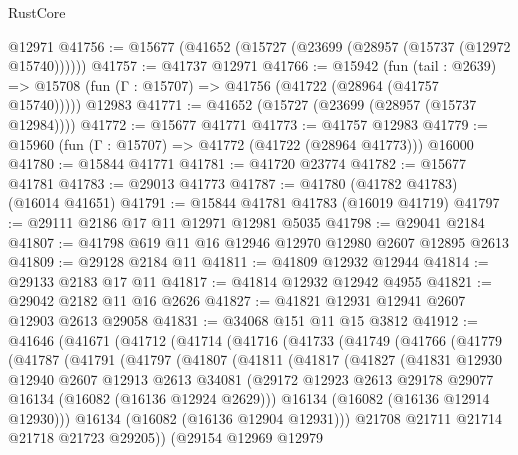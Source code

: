 \begin{lexlean}{RustCore}
\begin{coremodule}
    @12971
@41756 := @15677 (@41652 (@15727 (@23699 (@28957 (@15737 (@12972 @15740))))))
@41757 := @41737 @12971
@41766 := @15942
    (fun (tail : @2639) => @15708 (fun (Γ : @15707) => @41756 (@41722 (@28964 (@41757 @15740)))))
    @12983
@41771 := @41652 (@15727 (@23699 (@28957 (@15737 @12984))))
@41772 := @15677 @41771
@41773 := @41757 @12983
@41779 := @15960 (fun (Γ : @15707) => @41772 (@41722 (@28964 @41773))) @16000
@41780 := @15844 @41771
@41781 := @41720 @23774
@41782 := @15677 @41781
@41783 := @29013 @41773
@41787 := @41780 (@41782 @41783) (@16014 @41651)
@41791 := @15844 @41781 @41783 (@16019 @41719)
@41797 := @29111 @2186 @17 @11 @12971 @12981 @5035
@41798 := @29041 @2184
@41807 := @41798 @619 @11 @16 @12946 @12970 @12980 @2607 @12895 @2613
@41809 := @29128 @2184 @11
@41811 := @41809 @12932 @12944
@41814 := @29133 @2183 @17 @11
@41817 := @41814 @12932 @12942 @4955
@41821 := @29042 @2182 @11 @16 @2626
@41827 := @41821 @12931 @12941 @2607 @12903 @2613 @29058
@41831 := @34068 @151 @11 @15 @3812
@41912 := @41646
    (@41671
      (@41712
        (@41714
          (@41716
            (@41733
              (@41749
                (@41766
                  (@41779
                    (@41787
                      (@41791
                        (@41797
                          (@41807
                            (@41811
                              (@41817
                                (@41827
                                  (@41831
                                    @12930
                                    @12940
                                    @2607
                                    @12913
                                    @2613
                                    @34081
                                    (@29172
                                      @12923
                                      @2613
                                      @29178
                                      @29077
                                      @16134
                                      (@16082 (@16136 @12924 @2629)))
                                    @16134
                                    (@16082 (@16136 @12914 @12930)))
                                  @16134
                                  (@16082 (@16136 @12904 @12931)))
                                @21708
                                @21711
                                @21714
                                @21718
                                @21723
                                @29205))
                            (@29154
                              @12969
                              @12979

\end{coremodule}
\end{lexlean}
